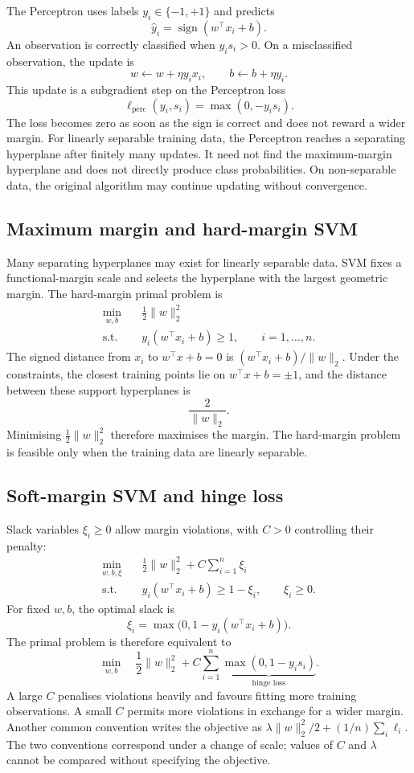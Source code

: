 The Perceptron uses labels $y_i\in\{-1,+1\}$ and predicts
\[
\widehat y_i=\operatorname{sign}(w^\top x_i+b).
\]
An observation is correctly classified when $y_is_i>0$. On a misclassified
observation, the update is
\[
w\leftarrow w+\eta y_ix_i,
\qquad
b\leftarrow b+\eta y_i.
\]
This update is a subgradient step on the Perceptron loss
\[
\ell_{\mathrm{perc}}(y_i,s_i)=\max(0,-y_is_i).
\]
The loss becomes zero as soon as the sign is correct and does not reward a wider
margin. For linearly separable training data, the Perceptron reaches a separating
hyperplane after finitely many updates. It need not find the maximum-margin
hyperplane and does not directly produce class probabilities. On non-separable
data, the original algorithm may continue updating without convergence.

\subsection{Maximum margin and hard-margin SVM}

Many separating hyperplanes may exist for linearly separable data. SVM fixes a
functional-margin scale and selects the hyperplane with the largest geometric
margin. The hard-margin primal problem is
\begin{align*}
\min_{w,b}\quad &\frac12\lVert w\rVert_2^2\\
\text{s.t.}\quad &y_i(w^\top x_i+b)\ge1,
\qquad i=1,\ldots,n.
\end{align*}
The signed distance from $x_i$ to $w^\top x+b=0$ is
$(w^\top x_i+b)/\lVert w\rVert_2$. Under the constraints, the closest training
points lie on $w^\top x+b=\pm1$, and the distance between these support
hyperplanes is
\[
\frac{2}{\lVert w\rVert_2}.
\]
Minimising $\tfrac12\lVert w\rVert_2^2$ therefore maximises the margin. The
hard-margin problem is feasible only when the training data are linearly
separable.

\LinearMarginFigure

\subsection{Soft-margin SVM and hinge loss}

Slack variables $\xi_i\ge0$ allow margin violations, with $C>0$ controlling
their penalty:
\begin{align*}
\min_{w,b,\xi}\quad
&\frac12\lVert w\rVert_2^2+C\sum_{i=1}^{n}\xi_i\\
\text{s.t.}\quad
&y_i(w^\top x_i+b)\ge1-\xi_i,
\qquad \xi_i\ge0.
\end{align*}
For fixed $w,b$, the optimal slack is
\[
\xi_i=\max\bigl(0,1-y_i(w^\top x_i+b)\bigr).
\]
The primal problem is therefore equivalent to
\[
\min_{w,b}\quad
\frac12\lVert w\rVert_2^2
+C\sum_{i=1}^{n}
\underbrace{\max(0,1-y_is_i)}_{\text{hinge loss}}.
\]
A large $C$ penalises violations heavily and favours fitting more training
observations. A small $C$ permits more violations in exchange for a wider
margin. Another common convention writes the objective as
$\lambda\lVert w\rVert_2^2/2+(1/n)\sum_i\ell_i$. The two conventions correspond
under a change of scale; values of $C$ and $\lambda$ cannot be compared without
specifying the objective.

